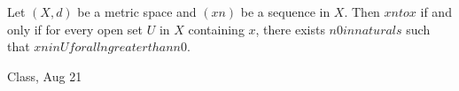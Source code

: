 \begin{samepage}
\begin{ex}
Let $(X, d)$ be a metric space and $(xn)$ be a sequence in $X$. Then $xn to x$ if and only if for every open set $U$ in $X$ containing $x$, there exists $n0 in naturals$ such that $xn in U for all n greater than n0$.
\end{ex}
\begin{source}
Class, Aug 21
\end{source}
\end{samepage}
